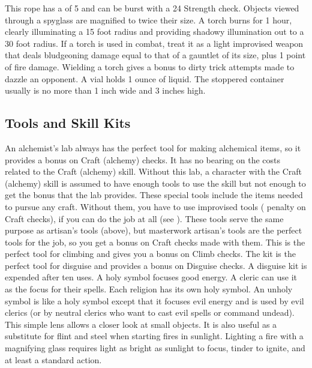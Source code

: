          This rope has a  of 5 and can be burst with a  24 Strength check.
         Objects viewed through a spyglass are magnified to twice their size.
         A torch burns for 1 hour, clearly illuminating a 15 foot radius and providing shadowy illumination out to a 30 foot radius. If a torch is used in combat, treat it as a light improvised weapon that deals bludgeoning damage equal to that of a gauntlet of its size, plus 1 point of fire damage. Wielding a torch gives a  bonus to dirty trick attempts made to dazzle an opponent.
         A vial holds 1 ounce of liquid. The stoppered container usually is no more than 1 inch wide and 3 inches high.

    \subsection{Tools and Skill Kits}
         An alchemist's lab always has the perfect tool for making alchemical items, so it provides a  bonus on Craft (alchemy) checks. It has no bearing on the costs related to the Craft (alchemy) skill. Without this lab, a character with the Craft (alchemy) skill is assumed to have enough tools to use the skill but not enough to get the  bonus that the lab provides.
         These special tools include the items needed to pursue any craft. Without them, you have to use improvised tools ( penalty on Craft checks), if you can do the job at all (see ).
         These tools serve the same purpose as artisan's tools (above), but masterwork artisan's tools are the perfect tools for the job, so you get a  bonus on Craft checks made with them.
         This is the perfect tool for climbing and gives you a  bonus on Climb checks.
         The kit is the perfect tool for disguise and provides a  bonus on Disguise checks. A disguise kit is expended after ten uses.
         A holy symbol focuses good energy. A cleric can use it as the focus for their spells. Each religion has its own holy symbol.
         An unholy symbol is like a holy symbol except that it focuses evil energy and is used by evil clerics (or by neutral clerics who want to cast evil spells or command undead).
         This simple lens allows a closer look at small objects. It is also useful as a substitute for flint and steel when starting fires in sunlight. Lighting a fire with a magnifying glass requires light as bright as sunlight to focus, tinder to ignite, and at least a standard action.
